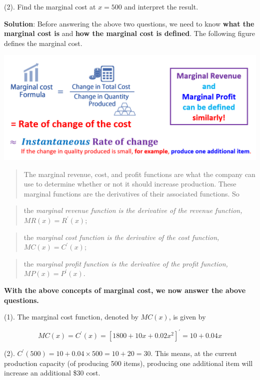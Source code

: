 \documentclass[
]{book}
\begin{document}
(2). Find the marginal cost at \(x= 500\) and interpret the result.

\textbf{Solution}: Before answering the above two questions, we need to know \textbf{what the marginal cost is} and \textbf{how the marginal cost is defined}. The following figure defines the marginal cost.

\begin{center}\includegraphics[width=0.8\linewidth]{img05/w05-MarginalCost} \end{center}

\begin{quote}
The marginal revenue, cost, and profit functions are what the company can use to determine whether or not it should increase production. These marginal functions are the derivatives of their associated functions. So
\end{quote}

\begin{quote}
the \emph{marginal revenue function is the derivative of the revenue function, \(MR(x) = R^\prime(x)\)};
\end{quote}

\begin{quote}
the \emph{marginal cost function is the derivative of the cost function, \(MC(x) = C^\prime(x)\)};
\end{quote}

\begin{quote}
the \emph{marginal profit function is the derivative of the profit function, \(MP(x) = P^\prime(x)\)}.
\end{quote}

\textbf{\color{red}With the above concepts of marginal cost, we now answer the above questions.}

(1). The marginal cost function, denoted by \(MC(x)\), is given by

\[
MC(x) = C^\prime(x) = [1800 + 10x + 0.02x^2]^\prime = 10 + 0.04x
\]

(2). \(C^\prime(500) = 10 + 0.04\times 500 = 10 + 20 = 30\). This means, at the current production capacity (of producing 500 items), producing one additional item will increase an additional \$30 cost.
\end{document}
